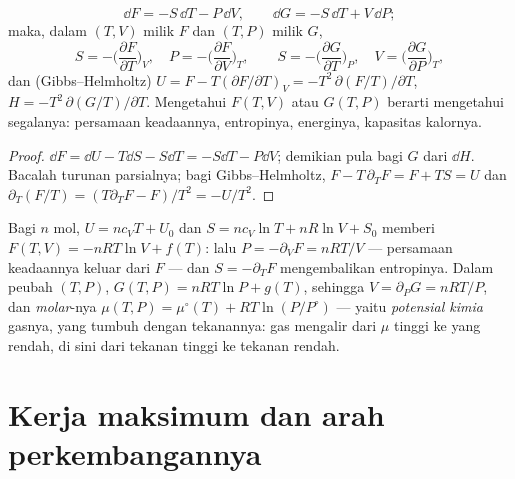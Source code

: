 \begin{theorem}\label{thm:b2:thermodynamic-potentials:dFdG}
\[
\dd F = -S\,\dd T - P\,\dd V, \qquad
\dd G = -S\,\dd T + V\,\dd P ;
\]
maka, dalam  $(T,V)$ milik $F$ dan $(T,P)$ milik $G$,
\[
S = -\Big(\frac{\partial F}{\partial T}\Big)_V, \quad
P = -\Big(\frac{\partial F}{\partial V}\Big)_T, \qquad
S = -\Big(\frac{\partial G}{\partial T}\Big)_P, \quad
V = \Big(\frac{\partial G}{\partial P}\Big)_T ,
\]
dan (Gibbs--Helmholtz) $U = F - T(\partial F/\partial T)_V =
-T^2\,\partial(F/T)/\partial T$, $H = -T^2\,\partial(G/T)/\partial T$.
Mengetahui $F(T,V)$ atau $G(T,P)$ berarti mengetahui segalanya: persamaan
keadaannya, entropinya, energinya, kapasitas kalornya.
\end{theorem}

\begin{proof}
$\dd F = \dd U - T\dd S - S\dd T = -S\dd T - P\dd V$; demikian pula bagi $G$
dari $\dd H$. Bacalah turunan parsialnya; bagi Gibbs--Helmholtz,
$F - T\,\partial_TF = F + TS = U$ dan $\partial_T(F/T) = (T\partial_TF -
F)/T^2 = -U/T^2$.
\end{proof}

\begin{example}\label{ex:b2:thermodynamic-potentials:perfect}
Bagi $n$ mol, $U = nc_{V}T + U_0$ dan $S = nc_V\ln T + nR\ln V + S_0$
memberi $F(T,V) = -nRT\ln V + f(T)$: lalu $P = -\partial_VF = nRT/V$
--- persamaan keadaannya keluar dari $F$ --- dan $S = -\partial_TF$
mengembalikan entropinya. Dalam peubah $(T,P)$, $G(T,P) = nRT\ln P +
g(T)$, sehingga $V = \partial_PG = nRT/P$, dan  \emph{molar}-nya
$\mu(T,P) = \mu^\circ(T) + RT\ln(P/P^\circ)$ --- yaitu \emph{potensial
kimia} gasnya, yang tumbuh dengan
tekanannya: gas mengalir dari $\mu$ tinggi ke yang rendah, di sini dari tekanan tinggi ke
tekanan rendah.
\end{example}

\section{Kerja maksimum dan arah perkembangannya}

